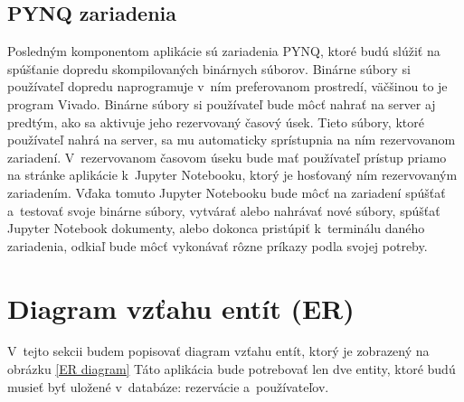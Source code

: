 \subsection{PYNQ zariadenia}

Posledným komponentom aplikácie sú zariadenia PYNQ, ktoré budú slúžiť na spúšťanie dopredu skompilovaných binárnych súborov. Binárne súbory si používateľ dopredu naprogramuje v~ním preferovanom prostredí, väčšinou to je program Vivado. Binárne súbory si používateľ bude môcť nahrať na server aj predtým, ako sa aktivuje jeho rezervovaný časový úsek. Tieto súbory, ktoré používateľ nahrá na server, sa mu automaticky sprístupnia na ním rezervovanom zariadení. V~rezervovanom časovom úseku bude mať používateľ prístup priamo na stránke aplikácie k~Jupyter Notebooku, ktorý je hosťovaný ním rezervovaným zariadením. Vďaka tomuto Jupyter Notebooku bude môcť na zariadení spúšťať a~testovať svoje binárne súbory, vytvárať alebo nahrávať nové súbory, spúšťať Jupyter Notebook dokumenty, alebo dokonca pristúpiť k~terminálu daného zariadenia, odkiaľ bude môcť vykonávať rôzne príkazy podla svojej potreby.


\section{Diagram vzťahu entít (ER)}

V~tejto sekcii budem popisovať diagram vzťahu entít, ktorý je zobrazený na obrázku \ref{ER diagram}
Táto aplikácia bude potrebovať len dve entity, ktoré budú musieť byť uložené v~databáze: rezervácie a~používateľov.

